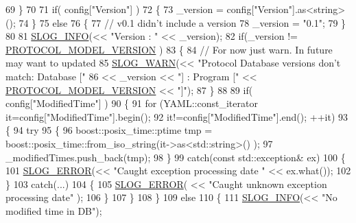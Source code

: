 \begin{DoxyCode}
{69         \}
70 
71         \textcolor{keywordflow}{if}( config[\textcolor{stringliteral}{"Version"}] )
72         \{
73             \_version = config[\textcolor{stringliteral}{"Version"}].as<\textcolor{keywordtype}{string}>();
74         \}
75         \textcolor{keywordflow}{else}
76         \{
77             \textcolor{comment}{// v0.1 didn't include a version}
78             \_version = \textcolor{stringliteral}{"0.1"};
79         \}
80         
81         \hyperlink{_logger_8h_a119c1c29ba35a8db38e2358e41167282}{SLOG\_INFO}(<< \textcolor{stringliteral}{"Version : "} << \_version);
82         \textcolor{keywordflow}{if}(\_version != \hyperlink{_protocol_model_db_8h_a92e0c4a4972115f1e9aec1a97d48eeb5}{PROTOCOL\_MODEL\_VERSION} )
83         \{
84             \textcolor{comment}{// For now just warn. In future may want to updated}
85             \hyperlink{_logger_8h_a1c6efad29ceef2a86c277eb2fbb67c85}{SLOG\_WARN}(<< \textcolor{stringliteral}{"Protocol Database versions don't match: Database ["} 
86                             << \_version << \textcolor{stringliteral}{"] : Program ["} << 
      \hyperlink{_protocol_model_db_8h_a92e0c4a4972115f1e9aec1a97d48eeb5}{PROTOCOL\_MODEL\_VERSION} << \textcolor{stringliteral}{"]"});
87         \}
88 
89         \textcolor{keywordflow}{if}( config[\textcolor{stringliteral}{"ModifiedTime"}] )
90         \{
91             \textcolor{keywordflow}{for} (YAML::const\_iterator it=config[\textcolor{stringliteral}{"ModifiedTime"}].begin(); 
92                         it!=config[\textcolor{stringliteral}{"ModifiedTime"}].end(); ++it)
93             \{
94                 \textcolor{keywordflow}{try} 
95                 \{
96                     boost::posix\_time::ptime tmp = boost::posix\_time::from\_iso\_string(it->as<std::string>()
      );
97                     \_modifiedTimes.push\_back(tmp);
98                 \}
99                 \textcolor{keywordflow}{catch}(\textcolor{keyword}{const} std::exception& ex)
100                 \{
101                     \hyperlink{_logger_8h_a2a8694cd392d18f4db6b9cc9f15bafe3}{SLOG\_ERROR}(<< \textcolor{stringliteral}{"Caught exception processing date "} << ex.what());
102                 \}
103                 \textcolor{keywordflow}{catch}(...)
104                 \{
105                     \hyperlink{_logger_8h_a2a8694cd392d18f4db6b9cc9f15bafe3}{SLOG\_ERROR}( << \textcolor{stringliteral}{"Caught unknown exception processing date"} );
106                 \}
107             \}
108         \}
109         \textcolor{keywordflow}{else}
110         \{
111             \hyperlink{_logger_8h_a119c1c29ba35a8db38e2358e41167282}{SLOG\_INFO}(<< \textcolor{stringliteral}{"No modified time in DB"});
}
\end{DoxyCode}
